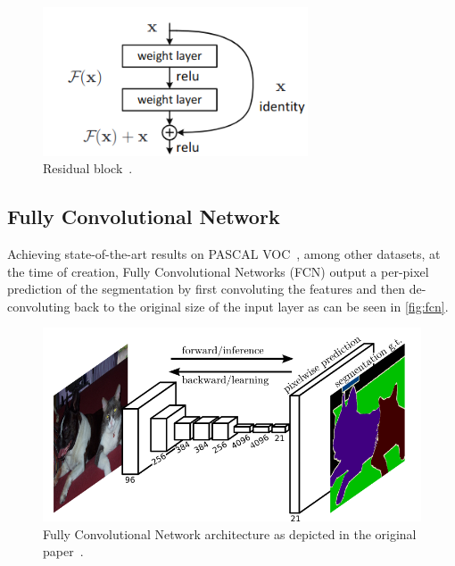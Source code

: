 \documentclass[oneside, english, bibtex]{kththesis}
\begin{document}
\begin{figure}[H]
  \begin{center}
    \includegraphics[width=0.7\textwidth]{figures/residual_block.png}
  \end{center}
  \caption{Residual block~\cite{he2016deep}.}
  \label{fig:residual}
\end{figure}

\subsection{Fully Convolutional Network}

Achieving state-of-the-art results on PASCAL VOC~\cite{DBLP:journals/corr/LongSD14}, among other datasets, at the time of creation, Fully Convolutional Networks (FCN) output a per-pixel prediction of the segmentation by first convoluting the features and then de-convoluting back to the original size of the input layer as can be seen in \autoref{fig:fcn}.

\begin{figure}[H]
  \begin{center}
    \includegraphics[width=1.0\textwidth]{figures/fcn.png}
  \end{center}
  \caption{Fully Convolutional Network architecture as depicted in the original paper~\cite{DBLP:journals/corr/LongSD14}.}
  \label{fig:fcn}
\end{figure}
\end{document}
